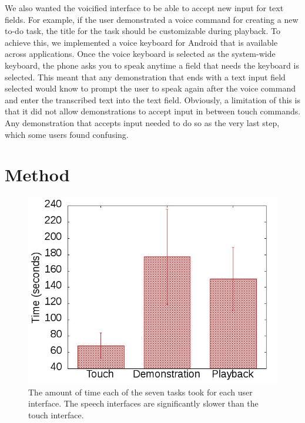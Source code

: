 \documentclass[letterpaper]{article}
\begin{document}
We also wanted the voicified interface to be able to accept new input for text fields. For 
example, if the user demonstrated a voice command for creating a new to-do task, the title for the task should be customizable during
playback. To achieve this, we implemented a voice keyboard for Android that is available across applications. 
Once the voice keyboard is selected as the system-wide keyboard, the phone asks you to speak anytime a field that needs the keyboard is selected. 
This meant that any demonstration that ends with a text input field selected would know to prompt the user to speak again after 
the voice command and enter the transcribed text into the text field. Obviously, a limitation of this is that it did not allow 
demonstrations to accept input in between touch commands. Any demonstration that accepts input needed to do so as the very last step, which
some users found confusing.




\section{Method}

\begin{figure}[t]
\begin{center}
\includegraphics[scale=0.4]{fig/results.jpg}
\end{center}
\caption{The amount of time each of the seven tasks took for each user interface. The speech interfaces are significantly slower than the touch interface.}
\label{fig:results}
\end{figure}
\end{document}
